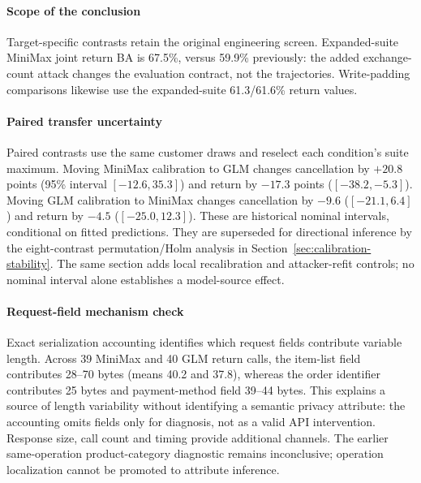 \paragraph{Scope of the conclusion} Target-specific contrasts retain the original engineering screen. Expanded-suite MiniMax joint return BA is 67.5\%, versus 59.9\% previously: the added exchange-count attack changes the evaluation contract, not the trajectories. Write-padding comparisons likewise use the expanded-suite 61.3/61.6\% return values.

\paragraph{Paired transfer uncertainty}
Paired contrasts use the same customer draws and reselect each condition's suite maximum. Moving MiniMax calibration to GLM changes cancellation by $+20.8$ points (95\% interval $[-12.6,35.3]$) and return by $-17.3$ points ($[-38.2,-5.3]$). Moving GLM calibration to MiniMax changes cancellation by $-9.6$ ($[-21.1,6.4]$) and return by $-4.5$ ($[-25.0,12.3]$). These are historical nominal intervals, conditional on fitted predictions. They are superseded for directional inference by the eight-contrast permutation/Holm analysis in Section~\ref{sec:calibration-stability}. The same section adds local recalibration and attacker-refit controls; no nominal interval alone establishes a model-source effect.

\paragraph{Request-field mechanism check}
Exact serialization accounting identifies which request fields contribute variable length. Across 39 MiniMax and 40 GLM return calls, the item-list field contributes 28--70 bytes (means 40.2 and 37.8), whereas the order identifier contributes 25 bytes and payment-method field 39--44 bytes. This explains a source of length variability without identifying a semantic privacy attribute: the accounting omits fields only for diagnosis, not as a valid API intervention. Response size, call count and timing provide additional channels. The earlier same-operation product-category diagnostic remains inconclusive; operation localization cannot be promoted to attribute inference.
